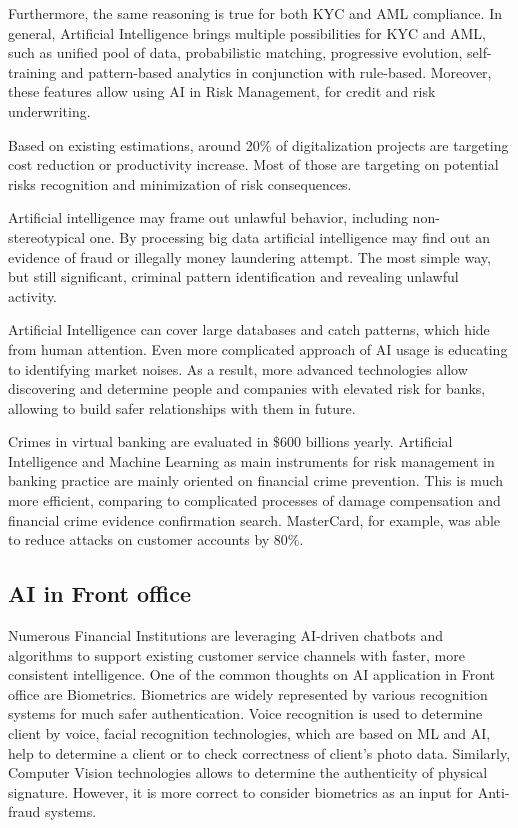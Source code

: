 Furthermore, the same reasoning is true for both KYC and AML compliance.
In general, Artificial Intelligence brings multiple possibilities for KYC and AML, such as unified pool of data, probabilistic matching, progressive evolution, self-training and pattern-based analytics in conjunction with rule-based.
Moreover, these features allow using AI in Risk Management, for credit and risk underwriting.


Based on existing estimations, around 20\% of digitalization projects are targeting cost reduction or productivity increase.
Most of those are targeting on potential risks recognition and minimization of risk consequences.
\cite{ai_reality_hype}

Artificial intelligence may frame out unlawful behavior, including non-stereotypical one.
By processing big data artificial intelligence may find out an evidence of fraud or illegally money laundering attempt.
The most simple way, but still significant, criminal pattern identification and revealing unlawful activity.
 
Artificial Intelligence can cover large databases and catch patterns, which hide from human attention.
Even more complicated approach of AI usage is educating to identifying market noises.
As a result, more advanced technologies allow discovering and determine people and companies with elevated risk for banks, allowing to build safer relationships with them in future.

Crimes in virtual banking are evaluated in \$600 billions yearly.
Artificial Intelligence and Machine Learning as main instruments for risk management in banking practice are mainly oriented on financial crime prevention.
This is much more efficient, comparing to complicated processes of damage compensation and financial crime evidence confirmation search.
MasterCard, for example, was able to reduce attacks on customer accounts by 80\%.
\cite{ways_ai_transforming_bi}
 


\subsection{AI in Front office}
\label{subsec:ai_front_office}

Numerous Financial Institutions are leveraging AI-driven chatbots and algorithms to support existing customer service channels with faster, more consistent intelligence.
One of the common thoughts on AI application in Front office are Biometrics.
Biometrics are widely represented by various recognition systems for much safer authentication.
Voice recognition is used to determine client by voice, facial recognition technologies, which are based on ML and AI, help to determine a client or to check correctness of client's photo data.
Similarly, Computer Vision technologies allows to determine the authenticity of physical signature.
However, it is more correct to consider biometrics as an input for Anti-fraud systems. 

